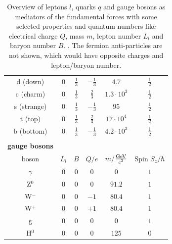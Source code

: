 \begin{table}[htbp]
\begin{tabular*}{\linewidth}{@{\extracolsep{\fill}}cccccc}
		\\
		\rule[-6pt]{0pt}{21pt} d (down) &  $0$	& $\frac{1}{3}$ & $-\frac{1}{3}$ & $4.7$ & $\frac{1}{2}$
		\\
		\rule[-6pt]{0pt}{21pt} c (charm) &  $0$	& $\frac{1}{3}$ & $\frac{2}{3}$ & $1.3\cdot10^3$ & $\frac{1}{2}$
		\\
		\rule[-6pt]{0pt}{21pt} s (strange) &  $0$	& $\frac{1}{3}$ & $-\frac{1}{3}$ & $95$ & $\frac{1}{2}$
		\\
		\rule[-6pt]{0pt}{21pt} t (top) &  $0$	& $\frac{1}{3}$ & $\frac{2}{3}$ & $17\cdot10^{4}$ & $\frac{1}{2}$
		\\
		\rule[-6pt]{0pt}{21pt} b (bottom) &  $0$	& $\frac{1}{3}$ & $-\frac{1}{3}$ & $4.2\cdot10^{3}$ & $\frac{1}{2}$
		\\
		\rule[-6pt]{0pt}{21pt}  & & & &
		\\
		\rule[-6pt]{0pt}{21pt} \textbf{gauge bosons} & & & &
		\\
		\hline
		\rule[-7pt]{0pt}{23pt} boson & \(L_l\) & $B$ & $Q/e$ & $m$/$\frac{\SI{}{\giga\electronvolt}}{\SI{}{\text{\ensuremath{c}\squared}}}$ & Spin $S_z/\hbar$
		\\
		\hline
		\rule[-6pt]{0pt}{21pt} $\gamma$ &  $0$	& $0$ & $0$ & $0$ & $1$
		\\
		\rule[-6pt]{0pt}{21pt} Z$^0$ &  $0$	& $0$ & $0$ & $91.2$ & $1$
		\\
		\rule[-6pt]{0pt}{21pt} W$^-$ &  $0$	& $0$ & $-1$ & $80.4$ & $1$
		\\
		\rule[-6pt]{0pt}{21pt} W$^+$ &  $0$	& $0$ & $+1$ & $80.4$ & $1$
		\\
		\rule[-6pt]{0pt}{21pt} g &  $0$	& $0$ & $0$ & $0$ & $1$
		\\
		\rule[-6pt]{0pt}{21pt} H$^0$ &  $0$	& $0$ & $0$ & $125$ & $0$
		\\
		\hline
		\hline
		\end{tabular*}
		\caption[Overview of elementary particles with some selected properties.]{Overview of leptons $l$, quarks $q$ and gauge bosons as mediators of the fundamental forces with some selected properties and quantum numbers like electrical charge $Q$, mass $m$, lepton number $L_l$ and baryon number $B$. \cite{Nair}\cite{PhysRevD}. The fermion anti-particles are not shown, which would have opposite charges and lepton/baryon number.}
		\label{SMtable}
	\end{table}
